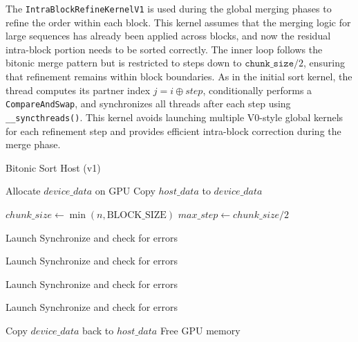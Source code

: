 \documentclass{article}
\begin{document}
The \texttt{IntraBlockRefineKernelV1} is used during the global merging phases to refine the order within each 
block. This kernel assumes that the merging logic for large sequences has already been applied across blocks, 
and now the residual intra-block portion needs to be sorted correctly. The inner loop follows the bitonic merge
pattern but is restricted to steps down to $\texttt{chunk\_size} / 2$, ensuring that refinement remains within 
block boundaries. As in the initial sort kernel, the thread computes its partner index $j = i \oplus step$, 
conditionally performs a \texttt{CompareAndSwap}, and synchronizes all threads after each step using 
\texttt{\_\_syncthreads()}. This kernel avoids launching multiple V0-style global kernels for each refinement 
step and provides efficient intra-block correction during the merge phase.

\begin{algorithm}[H]
\caption{Bitonic Sort Host (v1)}
\begin{algorithmic}[1]
    \State Allocate $device\_data$ on GPU
    \State Copy $host\_data$ to $device\_data$
    
    \State $chunk\_size \gets \min(n, \text{BLOCK\_SIZE})$
    \State $max\_step \gets chunk\_size / 2$
    
    \State Launch  
    \State Synchronize and check for errors

            \State Launch  
            \State Synchronize and check for errors
        \EndFor

        \State Launch  
        \State Synchronize and check for errors
    \EndFor

        \State Launch 
        \State Synchronize and check for errors
    \EndIf

    \State Copy $device\_data$ back to $host\_data$
    \State Free GPU memory
\EndProcedure
\end{algorithmic}
\end{algorithm}
\end{document}
